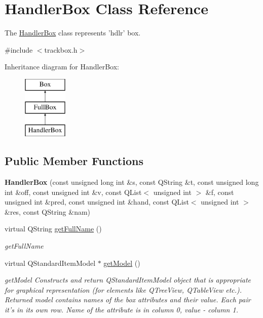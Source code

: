 \hypertarget{class_handler_box}{\section{Handler\-Box Class Reference}
\label{class_handler_box}
}


The \hyperlink{class_handler_box}{Handler\-Box} class represents 'hdlr' box.  




{\ttfamily \#include $<$trackbox.\-h$>$}

Inheritance diagram for Handler\-Box\-:\begin{figure}[H]
\begin{center}
\leavevmode
\includegraphics[height=3.000000cm]{class_handler_box}
\end{center}
\end{figure}
\subsection*{Public Member Functions}
\begin{DoxyCompactItemize}
\item 
\hypertarget{class_handler_box_a81904752952f0dbfb8f517d1b4849bae}{{\bfseries Handler\-Box} (const unsigned long int \&s, const Q\-String \&t, const unsigned long int \&off, const unsigned int \&v, const Q\-List$<$ unsigned int $>$ \&f, const unsigned int \&pred, const unsigned int \&hand, const Q\-List$<$ unsigned int $>$ \&res, const Q\-String \&nam)}\label{class_handler_box_a81904752952f0dbfb8f517d1b4849bae}

\item 
virtual Q\-String \hyperlink{class_handler_box_a77b90ca0801113aed5f6272035da0a04}{get\-Full\-Name} ()
\begin{DoxyCompactList}\small\item\em get\-Full\-Name \end{DoxyCompactList}\item 
virtual Q\-Standard\-Item\-Model $\ast$ \hyperlink{class_handler_box_a3d0550ec682df1ea81856082f431bc28}{get\-Model} ()
\begin{DoxyCompactList}\small\item\em get\-Model Constructs and return Q\-Standard\-Item\-Model object that is appropriate for graphical representation (for elements like Q\-Tree\-View, Q\-Table\-View etc.). Returned model contains names of the box attributes and their value. Each pair it's in its own row. Name of the attribute is in column 0, value -\/ column 1. \end{DoxyCompactList}\end{DoxyCompactItemize}
